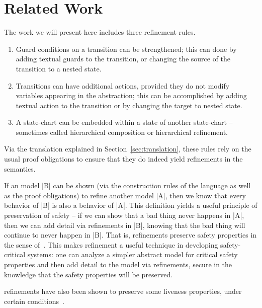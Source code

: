 
\section{Related Work}
\label{sec:relatedWork}

The work we will present here includes three refinement rules.

\begin{enumerate}
\item Guard conditions on a transition can be strengthened; 
this can done by adding textual guards to the transition, or
changing the source of the transition to a nested state.
\item Transitions can have additional actions, provided they do not
  modify variables appearing in the abstraction; this can be 
  accomplished by adding textual action to the transition 
  or by changing the target to nested state.
\item A state-chart can be embedded within a state of another
  state-chart -- sometimes called hierarchical composition or
  hierarchical refinement.
\end{enumerate}

Via the translation explained in Section~\ref{sec:translation}, these rules
rely on the usual \EventB proof obligations to ensure that they do
indeed yield refinements in the \EventB semantics.

If an \EventB model |B| can be shown (via the construction rules of
the \EventB language as well as the proof obligations) to refine
another \EventB model |A|, then we know that every behavior of |B| is
also a behavior of |A|. This definition yields a useful principle of
preservation of safety -- if we can show that a bad thing never
happens in |A|, then we can add detail via refinements in |B|, knowing
that the bad thing will continue to never happen in |B|. That is,
\EventB refinements preserve safety properties in the sense
of~\cite{lamport1977proving}. This makes refinement a useful technique
in developing safety-critical systems: one can analyze a simpler
abstract model for critical safety properties and then add detail to
the model via refinements, secure in the knowledge that the safety
properties will be preserved.

\EventB refinements have also been shown to preserve some liveness
properties, under certain conditions~\cite{hoang2016ltl}.

